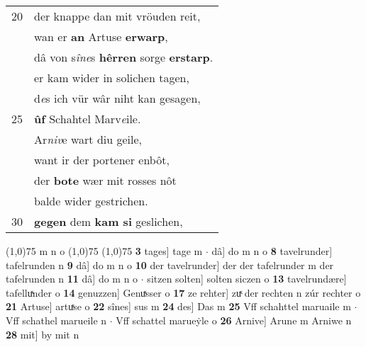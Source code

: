\documentclass[8pt,a4paper,notitlepage]{article}
\begin{document}
\begin{table}[ht]
\begin{minipage}[t]{0.5\linewidth}
\begin{tabular}{rl}
20 & der knappe dan mit vröuden reit,\\ 
 & wan er \textbf{an} Artuse \textbf{erwarp},\\ 
 & dâ von s\textit{îne}s \textbf{hêrren} sorge \textbf{erstarp}.\\ 
 & er kam wider in solichen tagen,\\ 
 & d\textit{e}s ich vür wâr niht kan gesagen,\\ 
25 & \textbf{ûf} Schahtel Marv\textit{e}ile.\\ 
 & Ar\textit{niv}e wart diu geile,\\ 
 & want ir der portener enbôt,\\ 
 & der \textbf{bote} wær mit rosses nôt\\ 
 & balde wider gestrichen.\\ 
30 & \textbf{gegen} dem \textbf{kam si} geslichen,\\ 
\end{tabular}
\scriptsize
\line(1,0){75} \newline
m n o \newline
\line(1,0){75} \newline
\newline
\line(1,0){75} \newline
\textbf{3} tages] tage m  $\cdot$ dâ] do m n o \textbf{8} tavelrunder] tafelrunden n \textbf{9} dâ] do m n o \textbf{10} der tavelrunder] der der tafelrunder m der tafelrunden n \textbf{11} dâ] do m n o  $\cdot$ sitzen solten] solten siczen o \textbf{13} tavelrundære] tafelluͯnder o \textbf{14} genuzzen] Genuͯsser o \textbf{17} ze rehter] zuͯ der rechten n zúr rechter o \textbf{21} Artuse] artuͯse o \textbf{22} sînes] sus m \textbf{24} des] Das m \textbf{25} Vff schahttel maruaile m  $\cdot$ Vff schathel marueile n  $\cdot$ Vff schattel marueẏle o \textbf{26} Arnive] Arune m Arniwe n \textbf{28} mit] by mit n \newline
\end{minipage}
\end{table}
\newpage
\end{document}
